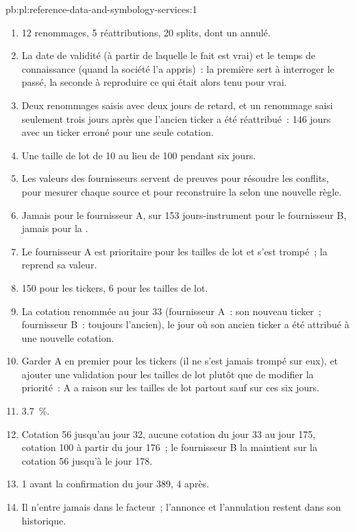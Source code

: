\begin{solution}{pb:pl:reference-data-and-symbology-services:1}
\begin{enumerate}
\item 12 renommages, 5 réattributions, 20 splits, dont un annulé.
\item La date de validité (à partir de laquelle le fait est vrai) et le temps de connaissance (quand la société l'a appris)~: la première sert à interroger
le passé, la seconde à reproduire ce qui était alors tenu pour vrai.
\item Deux renommages saisis avec deux jours de retard, et un renommage saisi seulement trois jours après que l'ancien ticker a été réattribué~:
146 jours avec un ticker erroné pour une seule cotation.
\item Une taille de lot de 10 au lieu de 100 pendant six jours.
\item Les valeurs des fournisseurs servent de preuves pour résoudre les conflits, pour mesurer chaque source et pour reconstruire la 
selon une nouvelle règle.
\item Jamais pour le fournisseur A, sur 153 jours-instrument pour le fournisseur B, jamais pour la .
\item Le fournisseur A est prioritaire pour les tailles de lot et s'est trompé~; la  reprend sa valeur.
\item 150 pour les tickers, 6 pour les tailles de lot.
\item La cotation renommée au jour 33 (fournisseur A~: son nouveau ticker~; fournisseur B~: toujours l'ancien), le jour où son ancien ticker a été attribué
à une nouvelle cotation.
\item Garder A en premier pour les tickers (il ne s'est jamais trompé sur eux), et ajouter une validation pour les tailles de lot plutôt que de modifier la priorité~: A
a raison sur les tailles de lot partout sauf sur ces six jours.
\item 3.7~\%.
\item Cotation 56 jusqu'au jour 32, aucune cotation du jour 33 au jour 175, cotation 100 à partir du jour 176~; le fournisseur B la maintient sur la cotation 56 jusqu'à
le jour 178.
\item 1 avant la confirmation du jour 389, 4 après.
\item Il n'entre jamais dans le facteur~; l'annonce et l'annulation restent dans son historique.

\end{enumerate}
\end{solution}
